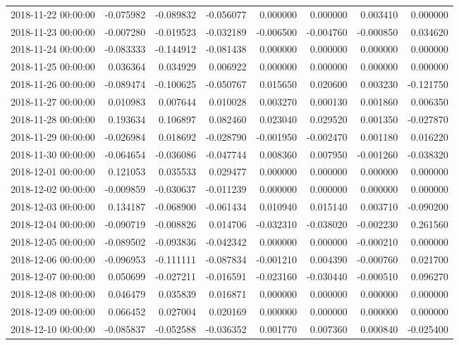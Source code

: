 \begin{tabular}{lrrrrrrr}
2018-11-22 00:00:00 & -0.075982 & -0.089832 & -0.056077 & 0.000000 & 0.000000 & 0.003410 & 0.000000 \\
2018-11-23 00:00:00 & -0.007280 & -0.019523 & -0.032189 & -0.006500 & -0.004760 & -0.000850 & 0.034620 \\
2018-11-24 00:00:00 & -0.083333 & -0.144912 & -0.081438 & 0.000000 & 0.000000 & 0.000000 & 0.000000 \\
2018-11-25 00:00:00 & 0.036364 & 0.034929 & 0.006922 & 0.000000 & 0.000000 & 0.000000 & 0.000000 \\
2018-11-26 00:00:00 & -0.089474 & -0.100625 & -0.050767 & 0.015650 & 0.020600 & 0.003230 & -0.121750 \\
2018-11-27 00:00:00 & 0.010983 & 0.007644 & 0.010028 & 0.003270 & 0.000130 & 0.001860 & 0.006350 \\
2018-11-28 00:00:00 & 0.193634 & 0.106897 & 0.082460 & 0.023040 & 0.029520 & 0.001350 & -0.027870 \\
2018-11-29 00:00:00 & -0.026984 & 0.018692 & -0.028790 & -0.001950 & -0.002470 & 0.001180 & 0.016220 \\
2018-11-30 00:00:00 & -0.064654 & -0.036086 & -0.047744 & 0.008360 & 0.007950 & -0.001260 & -0.038320 \\
2018-12-01 00:00:00 & 0.121053 & 0.035533 & 0.029477 & 0.000000 & 0.000000 & 0.000000 & 0.000000 \\
2018-12-02 00:00:00 & -0.009859 & -0.030637 & -0.011239 & 0.000000 & 0.000000 & 0.000000 & 0.000000 \\
2018-12-03 00:00:00 & 0.134187 & -0.068900 & -0.061434 & 0.010940 & 0.015140 & 0.003710 & -0.090200 \\
2018-12-04 00:00:00 & -0.090719 & -0.008826 & 0.014706 & -0.032310 & -0.038020 & -0.002230 & 0.261560 \\
2018-12-05 00:00:00 & -0.089502 & -0.093836 & -0.042342 & 0.000000 & 0.000000 & -0.000210 & 0.000000 \\
2018-12-06 00:00:00 & -0.096953 & -0.111111 & -0.087834 & -0.001210 & 0.004390 & -0.000760 & 0.021700 \\
2018-12-07 00:00:00 & 0.050699 & -0.027211 & -0.016591 & -0.023160 & -0.030440 & -0.000510 & 0.096270 \\
2018-12-08 00:00:00 & 0.046479 & 0.035839 & 0.016871 & 0.000000 & 0.000000 & 0.000000 & 0.000000 \\
2018-12-09 00:00:00 & 0.066452 & 0.027004 & 0.020169 & 0.000000 & 0.000000 & 0.000000 & 0.000000 \\
2018-12-10 00:00:00 & -0.085837 & -0.052588 & -0.036352 & 0.001770 & 0.007360 & 0.000840 & -0.025400 \\

\end{tabular}
